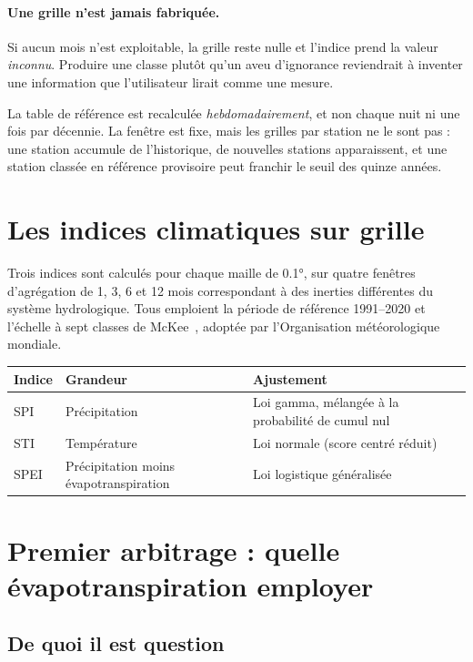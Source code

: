 \paragraph{Une grille n'est jamais fabriquée.} Si aucun mois n'est exploitable, la grille reste
nulle et l'indice prend la valeur \emph{inconnu}. Produire une classe plutôt qu'un aveu
d'ignorance reviendrait à inventer une information que l'utilisateur lirait comme une mesure.

La table de référence est recalculée \emph{hebdomadairement}, et non chaque nuit ni une fois par
décennie. La fenêtre est fixe, mais les grilles par station ne le sont pas : une station
accumule de l'historique, de nouvelles stations apparaissent, et une station classée en
référence provisoire peut franchir le seuil des quinze années.

\section{Les indices climatiques sur grille}

Trois indices sont calculés pour chaque maille de \ang{0.1}, sur quatre fenêtres d'agrégation de
1, 3, 6 et 12 mois correspondant à des inerties différentes du système hydrologique. Tous
emploient la période de référence 1991--2020 et l'échelle à sept classes de
McKee~\cite{mckee1993spi}, adoptée par l'Organisation météorologique mondiale.

\begin{center}
\begin{tabularx}{\textwidth}{@{}llX@{}}
\toprule
\textbf{Indice} & \textbf{Grandeur} & \textbf{Ajustement} \\
\midrule
SPI  & Précipitation & Loi gamma, mélangée à la probabilité de cumul nul \\
STI  & Température & Loi normale (score centré réduit) \\
SPEI & Précipitation moins évapotranspiration & Loi logistique généralisée \\
\bottomrule
\end{tabularx}
\end{center}

\section{Premier arbitrage : quelle évapotranspiration employer}
\label{sec:hargreaves}

\subsection{De quoi il est question}

